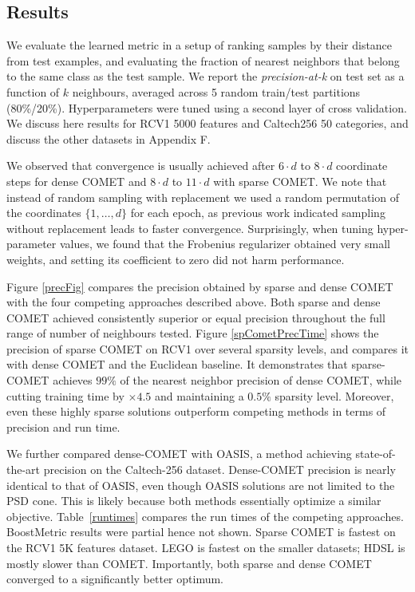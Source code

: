 \documentclass[twoside,11pt]{article}
\newcommand{\ignore}[1]{}
\newcommand{\tabref}[1]{Table~\ref{#1}}
\begin{document}
\vspace{-6pt}
\subsection{Results}\vskip -5pt
We evaluate the learned metric in a setup of ranking samples by their distance from test examples, and evaluating the fraction of nearest neighbors that belong to the same class as the test sample. We report the \textit{precision-at-k} on test set as a function of $k$ neighbours, averaged across 5 random train/test partitions (80\%/20\%). Hyperparameters were tuned using a second layer of cross validation. We discuss here results for RCV1 5000 features and Caltech256 50 categories, and discuss the other datasets in Appendix F.
\ignore{Figure \ref{cometConvergeFig} shows the \textit{precision-at-k} over the test sets as it progresses during learning. 
}
We observed that convergence is usually achieved after $6 \cdot d$ to $8 \cdot d$ coordinate steps for dense COMET and $8 \cdot d$ to $11 \cdot d$ with sparse COMET. We note that instead of random sampling with replacement we used a random permutation of the coordinates $\{1, \ldots, d\}$ for each epoch, as previous work indicated sampling without replacement leads to faster convergence.
Surprisingly, when tuning hyper-parameter values, we found that the Frobenius regularizer obtained very small weights, and setting its coefficient to zero did not harm performance. 

Figure \ref{precFig} compares the precision obtained by sparse and dense COMET with the four competing approaches described above. Both sparse and dense COMET achieved consistently superior or equal precision throughout the full range of number of neighbours tested.
Figure \ref{spCometPrecTime} shows the precision of sparse COMET on RCV1 over several sparsity levels, and compares it with dense COMET and the Euclidean baseline. It demonstrates that sparse-COMET achieves $99\%$ of the nearest neighbor precision of dense COMET, while cutting training time by $\times4.5$ and maintaining a $0.5\%$ sparsity level. Moreover, even these highly sparse solutions outperform competing methods in terms of precision and run time.

We further compared dense-COMET with OASIS, a method achieving state-of-the-art precision on the Caltech-256 dataset. Dense-COMET precision is nearly identical to that of OASIS, even though OASIS solutions are not limited to the PSD cone. This is likely because both methods essentially optimize a similar objective. \tabref{runtimes} compares the run times of the competing approaches. BoostMetric results were partial hence not shown. Sparse COMET is fastest on the RCV1 5K features dataset. LEGO is fastest on the smaller datasets; HDSL is mostly slower than COMET. Importantly, both sparse and dense COMET converged to a significantly better optimum.
\end{document}

